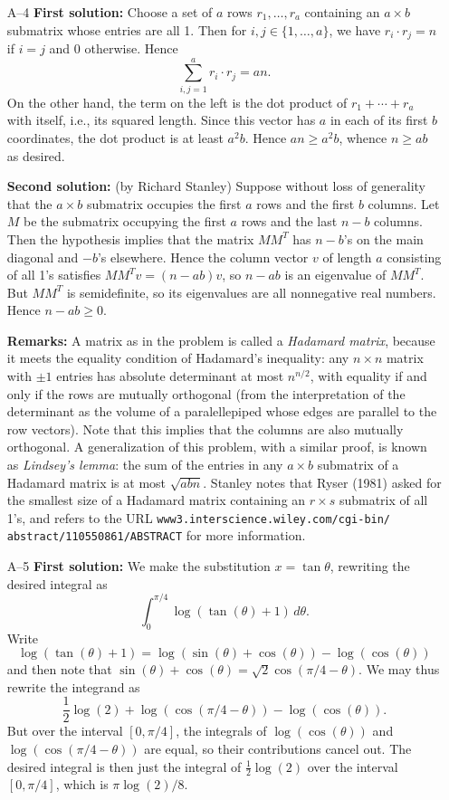 \documentclass[amssymb,twocolumn,pra,10pt,aps]{revtex4-1}
\begin{document}
\begin{itemize}
\item[A--4]
\textbf{First solution:}
Choose a set of $a$ rows $r_1, \dots, r_a$
containing an $a \times b$ submatrix whose
entries are all 1. Then for $i,j \in\{1, \dots, a\}$, we have
$r_i \cdot r_j = n$ if $i=j$ and 0 otherwise. Hence
\[
\sum_{i,j=1}^a r_i \cdot r_j = an.
\]
On the other hand, the term on the left is the dot product of
$r_1 + \cdots + r_a$ with itself, i.e., its squared length. Since
this vector has $a$ in each of its first $b$ coordinates, the dot product
is at least $a^2 b$. Hence $an \geq a^2 b$,
whence $n \geq ab$ as desired.

\textbf{Second solution:}
(by Richard Stanley)
Suppose without loss of generality that the $a \times b$ submatrix
occupies the first $a$ rows and the first $b$ columns.
Let $M$ be the submatrix occupying the first $a$ rows and the last
$n-b$ columns. Then the hypothesis implies that the matrix
$MM^T$ has $n-b$'s on the main diagonal and $-b$'s elsewhere.
Hence the column vector $v$ of length $a$ consisting of all 1's
satisfies $MM^T v = (n-ab)v$, so $n-ab$ is an eigenvalue of $MM^T$.
But $MM^T$ is semidefinite, so its eigenvalues are all nonnegative
real numbers. Hence $n-ab \geq 0$.

\textbf{Remarks:}
A matrix as in the problem is called a \emph{Hadamard matrix}, because
it meets the equality condition of Hadamard's inequality:
any $n \times n$ matrix with $\pm 1$ entries has absolute determinant
at most $n^{n/2}$, with equality if and only if the rows are mutually
orthogonal
(from the interpretation of the determinant as the volume of a paralellepiped
whose edges are parallel to the row vectors).
Note that this implies  that the columns are also mutually orthogonal.
A generalization of this problem, with a similar proof, is known
as \emph{Lindsey's lemma}: the sum of the entries in any
$a \times b$ submatrix of a Hadamard matrix is at most $\sqrt{abn}$.
Stanley notes that Ryser (1981) asked for the smallest size of a Hadamard
matrix containing an $r \times s$ submatrix of all 1's, and refers to
the URL \texttt{www3.interscience.wiley.com/cgi-bin/ abstract/110550861/ABSTRACT} for more information.

\item[A--5]
\textbf{First solution:}
We make the substitution $x = \tan \theta$, rewriting the desired integral as
\[
\int_0^{\pi/4} \log(\tan(\theta) + 1)\,d\theta.
\]
Write
\[
\log(\tan(\theta)+ 1) = \log(\sin(\theta) + \cos(\theta))-\log(\cos(\theta))
\]
and then note that $\sin(\theta) + \cos(\theta) = \sqrt{2} \cos
(\pi/4 - \theta)$. We may thus rewrite the integrand as
\[
\frac12 \log(2) + \log(\cos(\pi/4 - \theta)) - \log(\cos(\theta)).
\]
But over the interval $[0, \pi/4]$, the integrals of
$\log(\cos(\theta))$ and $\log(\cos(\pi/4 - \theta))$ are equal, so their
contributions cancel out. The desired integral is then just the integral
of $\frac{1}{2} \log(2)$ over the interval $[0,\pi/4]$, which is
$\pi \log(2)/8$.


\end{itemize}
\end{document}
